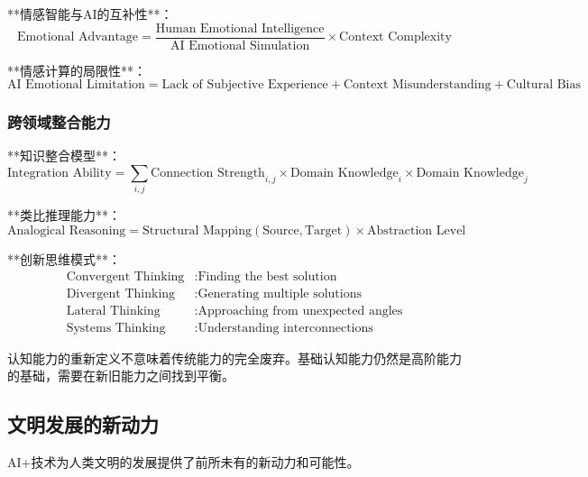 **情感智能与AI的互补性**：
\begin{equation}
\text{Emotional Advantage} = \frac{\text{Human Emotional Intelligence}}{\text{AI Emotional Simulation}} \times \text{Context Complexity}
\end{equation}

**情感计算的局限性**：
\begin{equation}
\text{AI Emotional Limitation} = \text{Lack of Subjective Experience} + \text{Context Misunderstanding} + \text{Cultural Bias}
\end{equation}

\subsubsection{跨领域整合能力} %

**知识整合模型**：
\begin{equation}
\text{Integration Ability} = \sum_{i,j} \text{Connection Strength}_{i,j} \times \text{Domain Knowledge}_i \times \text{Domain Knowledge}_j
\end{equation}

**类比推理能力**：
\begin{equation}
\text{Analogical Reasoning} = \text{Structural Mapping}(\text{Source}, \text{Target}) \times \text{Abstraction Level}
\end{equation}

**创新思维模式**：
\begin{align}
\text{Convergent Thinking} &: \text{Finding the best solution} \\
\text{Divergent Thinking} &: \text{Generating multiple solutions} \\
\text{Lateral Thinking} &: \text{Approaching from unexpected angles} \\
\text{Systems Thinking} &: \text{Understanding interconnections}
\end{align}

\begin{center}
认知能力的重新定义不意味着传统能力的完全废弃。基础认知能力仍然是高阶能力的基础，需要在新旧能力之间找到平衡。
\end{center}

\subsection{文明发展的新动力}

AI+技术为人类文明的发展提供了前所未有的新动力和可能性。

